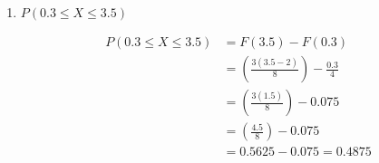 \begin{enumerate}[label=(\alph*)]
        \item $P(0.3 \leq X \leq 3.5)$
        \\
        \begin{mdframed}
            \begin{align*}
                P(0.3 \leq X \leq 3.5)  & = F(3.5) - F(0.3)                 \\
                                        & = \left(\frac{3(3.5-2)}{8}\right) - \frac{0.3}{4}   \\
                                        & = \left(\frac{3(1.5)}{8}\right) - 0.075   \\
                                        & = \left(\frac{4.5}{8}\right) - 0.075      \\
                                        & = 0.5625 - 0.075 = \boxed{0.4875}
            \end{align*}
        \end{mdframed}
    \end{enumerate}


